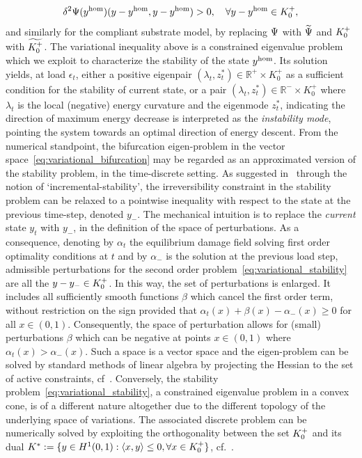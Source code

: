 \documentclass[10pt]{article}
\begin{document}
%
%
\begin{equation}
    \label{eq:variational_stability}
    \delta^2 \Psi(y^{\text{hom}})(y - y^{\text{hom}},  y - y^{\text{hom}})  > 0, \quad \forall y-y^{\text{hom}} \in K^+_{0},
\end{equation}
and similarly for the compliant substrate model, by replacing $\Psi$ with $\widetilde\Psi$ and $K^+_{0}$ with $\widetilde{K^+_{0}}$.
The variational inequality above is a constrained eigenvalue problem which we exploit to characterize the stability of the state $y^{\text{hom}}$. Its solution yields, at load $\epsilon_t$, either a positive eigenpair $(\lambda_t, z^*_t)\in \mathbb{R}^+\times K^+_0$ as a sufficient condition for the stability of current state, or a pair $(\lambda_t, z^*_t)\in \mathbb{R}^-\times K^+_0$ where $\lambda_t$ is the local (negative) energy curvature and the eigenmode $z^*_t$, indicating the direction of maximum energy decrease is interpreted as the \emph{instability mode}, pointing the system towards an optimal direction of energy descent.
From the numerical standpoint, the bifurcation eigen-problem in the vector space~\eqref{eq:variational_bifurcation} may be regarded as an approximated version of the stability problem, in the time-discrete setting. As suggested in~\cite{Baldelli2021-gc} through the notion of `incremental-stability', the irreversibility constraint in the stability problem can be relaxed to a pointwise inequality with respect to the state at the previous time-step, denoted $y_-$.
The mechanical intuition is to replace the \emph{current} state $y_t$ with $y_-$, in the definition of the space of perturbations.
As a consequence, denoting by $\alpha_t$ the equilibrium damage field solving first order optimality conditions at $t$ and by $\alpha_-$ is the solution at the previous load step, admissible perturbations for the second order problem~\eqref{eq:variational_stability} are all the $y-y_-\in K^+_{0}$. In this way, the set of perturbations is enlarged. It includes all sufficiently smooth functions $\beta$ which cancel the first order term, without restriction on the sign provided that $\alpha_t(x) + \beta(x) - \alpha_-(x)\geq 0$ for all $x\in (0, 1)$.
%
%
Consequently, the space of perturbation allows for (small) perturbations $\beta$ which can be negative at points $x\in(0,1)$ where $\alpha_t(x)>\alpha_-(x)$.
Such a space is a vector space and the eigen-problem can be solved by standard methods of linear algebra by projecting the Hessian to the set of active constraints, cf~\cite{Nocedal1999-zr}.
Conversely, the stability problem~\eqref{eq:variational_stability}, a constrained eigenvalue problem in a convex cone, is of a different nature altogether due to the different topology of the underlying space of variations.
The associated discrete problem can be numerically solved by exploiting the orthogonality between the set $K^+_{0}$ and its dual $K^*:=\{y \in H^1(0,1): \langle x,y \rangle \leq 0, \forall x \in K^+_{0}\}$, cf.~\cite{Moreau1962-fz,Pinto_da_Costa2010-qv}.
\end{document}

